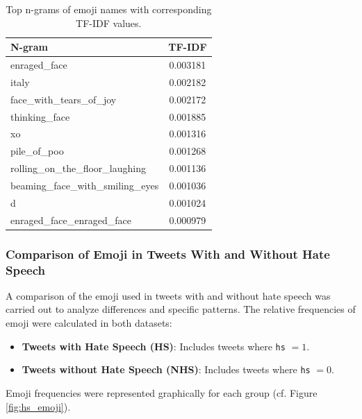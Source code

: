 \begin{table}[!h]
    \centering
    \begin{tabular}{lc}
    \toprule
    \textbf{N-gram} & \textbf{TF-IDF} \\
    \midrule
    enraged\_face & 0.003181 \\
    italy & 0.002182 \\
    face\_with\_tears\_of\_joy & 0.002172 \\
    thinking\_face & 0.001885 \\
    xo & 0.001316 \\
    pile\_of\_poo & 0.001268 \\
    rolling\_on\_the\_floor\_laughing & 0.001136 \\
    beaming\_face\_with\_smiling\_eyes & 0.001036 \\
    d & 0.001024 \\
    enraged\_face\_enraged\_face & 0.000979 \\
    \bottomrule
    \end{tabular}
    \caption{Top n-grams of emoji names with corresponding TF-IDF values.}
    \label{tab:tfidf_results}
\end{table}

\subsubsection{Comparison of Emoji in Tweets With and Without Hate Speech}
A comparison of the emoji used in tweets with and without hate speech was carried out to analyze differences and specific patterns. The relative frequencies of emoji were calculated in both datasets:
\begin{itemize}
    \item \textbf{Tweets with Hate Speech (HS)}: Includes tweets where \texttt{hs} $= 1$.
    \item \textbf{Tweets without Hate Speech (NHS)}: Includes tweets where \texttt{hs} $= 0$.
\end{itemize}
Emoji frequencies were represented graphically for each group (cf. Figure \ref{fig:hs_emoji}).

